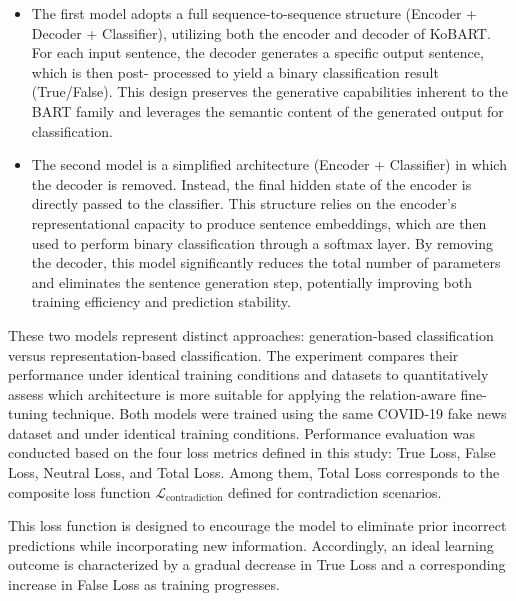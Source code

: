 \documentclass[a4paper,fleqn]{cas-sc}
\begin{document}
\begin{itemize}
    \item The first model adopts a full sequence-to-sequence structure (Encoder + Decoder +
    Classifier), utilizing both the encoder and decoder of KoBART. For each input
    sentence, the decoder generates a specific output sentence, which is then post-
    processed to yield a binary classification result (True/False). This design preserves the
    generative capabilities inherent to the BART family and leverages the semantic
    content of the generated output for classification.
    \item The second model is a simplified architecture (Encoder + Classifier) in which the
    decoder is removed. Instead, the final hidden state of the encoder is directly passed to
    the classifier. This structure relies on the encoder's representational capacity to
    produce sentence embeddings, which are then used to perform binary classification
    through a softmax layer. By removing the decoder, this model significantly reduces
    the total number of parameters and eliminates the sentence generation step, potentially
    improving both training efficiency and prediction stability.
\end{itemize}

These two models represent distinct approaches: generation-based classification versus representation-based classification. The experiment compares their performance under identical training conditions and datasets to quantitatively assess which architecture is more suitable for applying the relation-aware fine-tuning technique.
Both models were trained using the same COVID-19 fake news dataset and under identical training conditions. Performance evaluation was conducted based on the four loss metrics defined in this study: True Loss, False Loss, Neutral Loss, and Total Loss. Among them, Total Loss corresponds to the composite loss function \( \mathcal{L}_{\text{contradiction}} \) defined for contradiction scenarios.

This loss function is designed to encourage the model to eliminate prior incorrect predictions while incorporating new information. Accordingly, an ideal learning outcome is characterized by a gradual decrease in True Loss and a corresponding increase in False Loss as training progresses.

\end{document}
